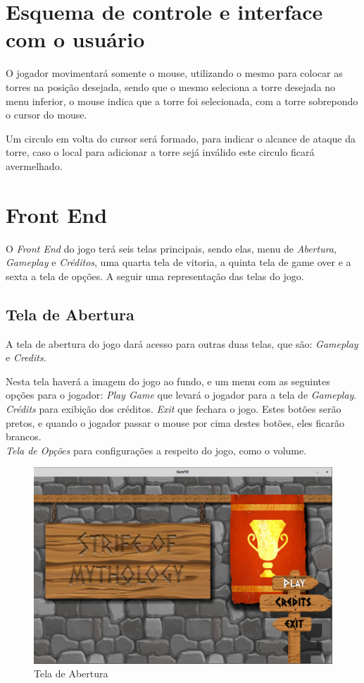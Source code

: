 \documentclass[11pt]{article} %
\begin{document}
\section{Esquema de controle e interface com o usuário}

O jogador movimentará somente o mouse, utilizando o mesmo para colocar as torres na posição desejada, sendo que o mesmo seleciona a torre desejada no menu inferior, o mouse indica que a torre foi selecionada, com a torre sobrepondo o cursor do mouse.

Um circulo em volta do cursor será formado, para indicar o alcance de ataque da torre, caso o local para adicionar a torre sejá inválido este circulo ficará avermelhado.  

\newpage

\section{Front End}

O \textit{Front End} do jogo terá seis telas principais, sendo elas, menu de \textit{Abertura}, \textit{Gameplay} e \textit{Créditos}, uma quarta tela de vitoria, a quinta tela de game over e a sexta a tela de opções. A seguir uma representação das telas do jogo.

\subsection{Tela de Abertura}
A tela de abertura do jogo dará acesso para outras duas telas, que são: \textit{Gameplay} e \textit{Credits}.

Nesta tela haverá a imagem do jogo ao fundo, e um menu com as seguintes opções para o jogador: 
\textit{Play Game} que levará o jogador para a tela de \textit{Gameplay}.
\textit{Crédits} para exibição dos créditos.
\textit{Exit} que fechara o jogo.
Estes botões serão pretos, e quando o jogador passar o mouse por cima destes botões, eles ficarão brancos.\\
\textit{Tela de Opções} para configurações a respeito do jogo, como o volume.

\begin{figure}[!htp]
\centering
\includegraphics[scale=0.4]{res/menu_display.png}
\caption{Tela de Abertura}
\label{Abertura}
\end{figure}
\end{document}
